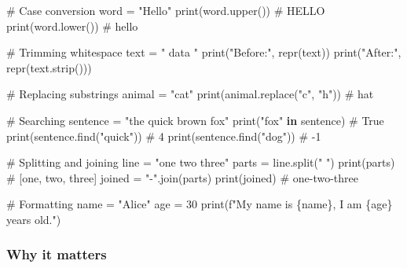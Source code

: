 \documentclass[
  letterpaper,
  DIV=11,
  numbers=noendperiod]{scrreprt}
\newenvironment{Shaded}{\begin{snugshade}}{\end{snugshade}}
\newcommand{\BuiltInTok}[1]{\textcolor[rgb]{0.00,0.23,0.31}{#1}}
\newcommand{\CommentTok}[1]{\textcolor[rgb]{0.37,0.37,0.37}{#1}}
\newcommand{\DecValTok}[1]{\textcolor[rgb]{0.68,0.00,0.00}{#1}}
\newcommand{\KeywordTok}[1]{\textcolor[rgb]{0.00,0.23,0.31}{\textbf{#1}}}
\newcommand{\NormalTok}[1]{\textcolor[rgb]{0.00,0.23,0.31}{#1}}
\newcommand{\OperatorTok}[1]{\textcolor[rgb]{0.37,0.37,0.37}{#1}}
\newcommand{\SpecialCharTok}[1]{\textcolor[rgb]{0.37,0.37,0.37}{#1}}
\newcommand{\SpecialStringTok}[1]{\textcolor[rgb]{0.13,0.47,0.30}{#1}}
\newcommand{\StringTok}[1]{\textcolor[rgb]{0.13,0.47,0.30}{#1}}
\begin{document}
\begin{Shaded}
\begin{Highlighting}[]
\CommentTok{\# Case conversion}
\NormalTok{word }\OperatorTok{=} \StringTok{"Hello"}
\BuiltInTok{print}\NormalTok{(word.upper())   }\CommentTok{\# HELLO}
\BuiltInTok{print}\NormalTok{(word.lower())   }\CommentTok{\# hello}

\CommentTok{\# Trimming whitespace}
\NormalTok{text }\OperatorTok{=} \StringTok{"   data  "}
\BuiltInTok{print}\NormalTok{(}\StringTok{"Before:"}\NormalTok{, }\BuiltInTok{repr}\NormalTok{(text))}
\BuiltInTok{print}\NormalTok{(}\StringTok{"After:"}\NormalTok{, }\BuiltInTok{repr}\NormalTok{(text.strip()))}

\CommentTok{\# Replacing substrings}
\NormalTok{animal }\OperatorTok{=} \StringTok{"cat"}
\BuiltInTok{print}\NormalTok{(animal.replace(}\StringTok{"c"}\NormalTok{, }\StringTok{"h"}\NormalTok{))  }\CommentTok{\# hat}

\CommentTok{\# Searching}
\NormalTok{sentence }\OperatorTok{=} \StringTok{"the quick brown fox"}
\BuiltInTok{print}\NormalTok{(}\StringTok{"fox"} \KeywordTok{in}\NormalTok{ sentence)        }\CommentTok{\# True}
\BuiltInTok{print}\NormalTok{(sentence.find(}\StringTok{"quick"}\NormalTok{))   }\CommentTok{\# 4}
\BuiltInTok{print}\NormalTok{(sentence.find(}\StringTok{"dog"}\NormalTok{))     }\CommentTok{\# {-}1}

\CommentTok{\# Splitting and joining}
\NormalTok{line }\OperatorTok{=} \StringTok{"one two three"}
\NormalTok{parts }\OperatorTok{=}\NormalTok{ line.split(}\StringTok{" "}\NormalTok{)}
\BuiltInTok{print}\NormalTok{(parts)  }\CommentTok{\# [\textquotesingle{}one\textquotesingle{}, \textquotesingle{}two\textquotesingle{}, \textquotesingle{}three\textquotesingle{}]}
\NormalTok{joined }\OperatorTok{=} \StringTok{"{-}"}\NormalTok{.join(parts)}
\BuiltInTok{print}\NormalTok{(joined)  }\CommentTok{\# one{-}two{-}three}

\CommentTok{\# Formatting}
\NormalTok{name }\OperatorTok{=} \StringTok{"Alice"}
\NormalTok{age }\OperatorTok{=} \DecValTok{30}
\BuiltInTok{print}\NormalTok{(}\SpecialStringTok{f"My name is }\SpecialCharTok{\{}\NormalTok{name}\SpecialCharTok{\}}\SpecialStringTok{, I am }\SpecialCharTok{\{}\NormalTok{age}\SpecialCharTok{\}}\SpecialStringTok{ years old."}\NormalTok{)}
\end{Highlighting}
\end{Shaded}

\subsubsection{Why it matters}\label{why-it-matters-33}
\end{document}
